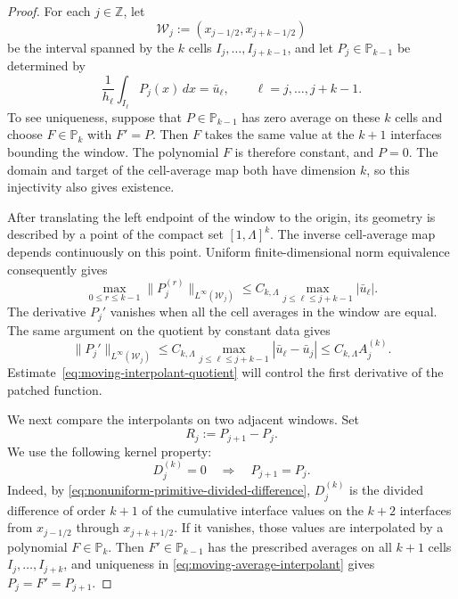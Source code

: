 \documentclass[11pt]{amsart}
\theoremstyle{plain}
\theoremstyle{definition}
\theoremstyle{remark}
\numberwithin{equation}{section}
\theoremstyle{plain}
\begin{document}
\begin{proof}
	For each $j\in\mathbb Z$, let
	\[
	\mathcal W_j:=(x_{j-1/2},x_{j+k-1/2})
	\]
	be the interval spanned by the $k$ cells
	$I_j,\ldots,I_{j+k-1}$, and let $P_j\in\mathbb P_{k-1}$ be determined by
	\begin{equation}\label{eq:moving-average-interpolant}
		\frac1{h_\ell}\int_{I_\ell}P_j(x)\,dx=\bar u_\ell,
		\qquad \ell=j,\ldots,j+k-1.
	\end{equation}
	To see uniqueness, suppose that $P\in\mathbb P_{k-1}$ has zero average on
	these $k$ cells and choose $F\in\mathbb P_k$ with $F'=P$.  Then $F$ takes
	the same value at the $k+1$ interfaces bounding the window.  The polynomial
	$F$ is therefore constant, and $P=0$.
	The domain and target of the cell-average map both have dimension $k$, so
	this injectivity also gives existence.
	
	After translating the left endpoint of the window to the origin, its
	geometry is described by a point of the compact set $[1,\Lambda]^k$.
	The inverse cell-average map depends continuously on this point.  Uniform
	finite-dimensional norm equivalence consequently gives
	\begin{equation}\label{eq:moving-interpolant-stability}
		\max_{0\le r\le k-1}
		\|P_j^{(r)}\|_{L^\infty(\mathcal W_j)}
		\le C_{k,\Lambda}
		\max_{j\le\ell\le j+k-1}|\bar u_\ell|.
	\end{equation}
	The derivative $P_j'$ vanishes when all the cell averages in the window are
	equal.  The same argument on the quotient by constant data gives
	\begin{equation}\label{eq:moving-interpolant-quotient}
		\|P_j'\|_{L^\infty(\mathcal W_j)}
		\le C_{k,\Lambda}
		\max_{j\le\ell\le j+k-1}
		|\bar u_\ell-\bar u_j|
		\le C_{k,\Lambda}A_j^{(k)}.
	\end{equation}
	Estimate~\eqref{eq:moving-interpolant-quotient} will control the first
	derivative of the patched function.
	
	We next compare the interpolants on two adjacent windows.  Set
	\[
	R_j:=P_{j+1}-P_j.
	\]
	We use the following kernel property:
	\begin{equation}\label{eq:adjacent-window-kernel}
		D_j^{(k)}=0
		\quad\Longrightarrow\quad
		P_{j+1}=P_j.
	\end{equation}
	Indeed, by \eqref{eq:nonuniform-primitive-divided-difference},
	$D_j^{(k)}$ is the divided difference of order $k+1$ of the cumulative
	interface values on the $k+2$ interfaces from $x_{j-1/2}$ through
	$x_{j+k+1/2}$.  If it vanishes, those values are interpolated by a
	polynomial $F\in\mathbb P_k$.  Then $F'\in\mathbb P_{k-1}$ has the
	prescribed averages on all $k+1$ cells $I_j,\ldots,I_{j+k}$, and uniqueness
	in \eqref{eq:moving-average-interpolant} gives
	$P_j=F'=P_{j+1}$.
	

\end{proof}
\end{document}
